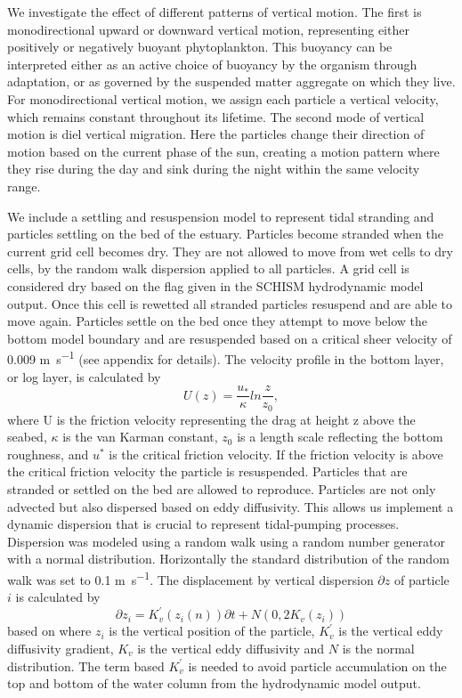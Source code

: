 \documentclass[npg, manuscript]{copernicus}
\begin{document}
We investigate the effect of different patterns of vertical motion.
The first is monodirectional upward or downward vertical motion, representing either positively or negatively buoyant phytoplankton.
This buoyancy can be interpreted either as an active choice of buoyancy by the organism through adaptation, or as governed by the suspended matter aggregate on which they live.
For monodirectional vertical motion, we assign each particle a vertical velocity, which remains constant throughout its lifetime.
The second mode of vertical motion is diel vertical migration.
Here the particles change their direction of motion based on the current phase of the sun, creating a motion pattern where they rise during the day and sink during the night within the same velocity range.

We include a settling and resuspension model to represent tidal stranding and particles settling on the bed of the estuary.
Particles become stranded when the current grid cell becomes dry. 
They are not allowed to move from wet cells to dry cells, by the random walk dispersion applied to all particles.
A grid cell is considered dry based on the flag given in the SCHISM  hydrodynamic model output.
Once this cell is rewetted all stranded particles resuspend and are able to move again.
Particles settle on the bed once they attempt to move below the bottom model boundary and are resuspended based on a critical sheer velocity of 0.009 \unit{m s^{-1}} (see appendix for details).
The velocity profile in the bottom layer, or log layer, is calculated by
\begin{equation}
    U(z) = \frac{u_{*}}{\kappa} ln \frac{z}{z_{0}},
\end{equation}
where U is the friction velocity representing the drag at height z  above the seabed, $\kappa$ is the van Karman constant, $z_{0}$ is a length
scale reflecting the bottom roughness, and $u^{*}$ is the critical friction velocity.
If the friction velocity is above the critical friction velocity the particle is resuspended.
Particles that are stranded or settled on the bed are allowed to reproduce.
Particles are not only advected but also dispersed based on eddy diffusivity.
This allows us implement a dynamic dispersion that is crucial to represent tidal-pumping processes.
Dispersion was modeled using a random walk using a random number generator with a normal distribution.
Horizontally the standard distribution of the random walk was set to 0.1 \unit{m s^{-1}}.
The displacement by vertical dispersion $\partial z$ of particle $i$ is calculated by
\begin{equation}
    \partial z_{i} = K_{v}^{'}(z_{i}(n))\partial t + N(0, 2K_{v}(z_{i}))
\end{equation}
based on \citet{Yamazaki2014} where $z_{i}$ is the vertical position of the particle, $K_{v}^{'}$ is the vertical eddy diffusivity gradient, $K_{v}$ is the vertical eddy diffusivity and $N$ is the normal distribution.
The term based $K_{v}^{'}$ is needed to avoid particle accumulation on the top and bottom of the water column from the hydrodynamic model output.
\end{document}
